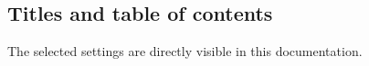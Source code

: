 \documentclass{tutodoc}
\begin{document}
\subsection{Titles and table of contents}

The selected settings are directly visible in this documentation.
\end{document}
